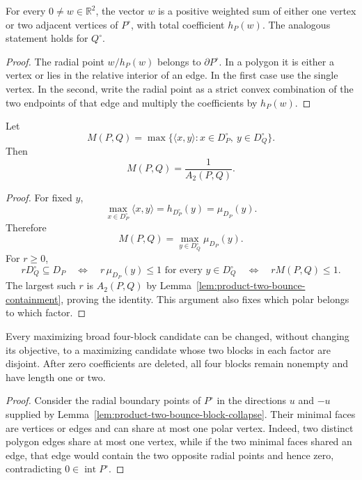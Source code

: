 \begin{unverified}
\begin{lemma}
\label{lem:product-two-bounce-radial-encoding}
For every \(0\neq w\in\mathbb R^2\), the vector \(w\) is a positive weighted
sum of either one vertex or two adjacent vertices of \(P^\circ\), with total
coefficient \(h_P(w)\).  The analogous statement holds for \(Q^\circ\).
\end{lemma}

\begin{proof}
The radial point \(w/h_P(w)\) belongs to \(\partial P^\circ\).  In a polygon
it is either a vertex or lies in the relative interior of an edge.  In the
first case use the single vertex.  In the second, write the radial point as a
strict convex combination of the two endpoints of that edge and multiply
the coefficients by \(h_P(w)\).
\end{proof}

\begin{lemma}
\label{lem:product-two-bounce-polar-pairing}
Let
\[
 M(P,Q)=\max\{\langle x,y\rangle:
                    x\in D_P^\circ,\ y\in D_Q^\circ\}.
\]
Then
\begin{equation}
\label{eq:product-two-bounce-polar-pairing}
 M(P,Q)=\frac1{A_2(P,Q)}.
\end{equation}
\end{lemma}

\begin{proof}
For fixed \(y\),
\[
 \max_{x\in D_P^\circ}\langle x,y\rangle
 =h_{D_P^\circ}(y)=\mu_{D_P}(y).
\]
Therefore
\[
 M(P,Q)=\max_{y\in D_Q^\circ}\mu_{D_P}(y).
\]
For \(r\geq0\),
\[
 rD_Q^\circ\subseteq D_P
 \quad\Longleftrightarrow\quad
 r\,\mu_{D_P}(y)\leq1
 \text{ for every }y\in D_Q^\circ
 \quad\Longleftrightarrow\quad
 rM(P,Q)\leq1.
\]
The largest such \(r\) is \(A_2(P,Q)\) by
Lemma~\ref{lem:product-two-bounce-containment}, proving the identity.  This
argument also fixes which polar belongs to which factor.
\end{proof}

\begin{proposition}
\label{prop:product-two-bounce-distinct-repair}
Every maximizing broad four-block candidate can be changed, without changing
its objective, to a maximizing candidate whose two blocks in each factor are
disjoint.  After zero coefficients are deleted, all four blocks remain
nonempty and have length one or two.
\end{proposition}

\begin{proof}
Consider the radial boundary points of \(P^\circ\) in the directions \(u\)
and \(-u\) supplied by
Lemma~\ref{lem:product-two-bounce-block-collapse}.  Their minimal faces are
vertices or edges and can share at most one polar vertex.  Indeed, two
distinct polygon edges share at most one vertex, while if the two minimal
faces shared an edge, that edge would contain the two opposite radial points
and hence zero, contradicting \(0\in\operatorname{int}P^\circ\).


\end{proof}
\end{unverified}
